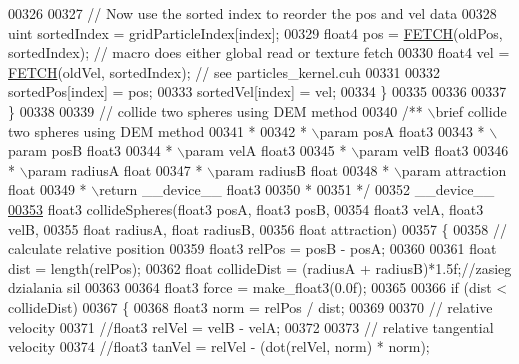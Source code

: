 \begin{DoxyCode}
00326 
00327         \textcolor{comment}{// Now use the sorted index to reorder the pos and vel data}
00328         uint sortedIndex = gridParticleIndex[index];
00329         float4 pos = \hyperlink{particles__kernel_8cuh_a12269d678a65f18889c2a7e98c756457}{FETCH}(oldPos, sortedIndex);       \textcolor{comment}{// macro does either global read or
       texture fetch}
00330         float4 vel = \hyperlink{particles__kernel_8cuh_a12269d678a65f18889c2a7e98c756457}{FETCH}(oldVel, sortedIndex);       \textcolor{comment}{// see particles\_kernel.cuh}
00331 
00332         sortedPos[index] = pos;
00333         sortedVel[index] = vel;
00334     \}
00335 
00336 
00337 \}
00338 
00339 \textcolor{comment}{// collide two spheres using DEM method}
00340 \textcolor{comment}{/** \(\backslash\)brief collide two spheres using DEM method}
00341 \textcolor{comment}{ *}
00342 \textcolor{comment}{ * \(\backslash\)param posA float3}
00343 \textcolor{comment}{ * \(\backslash\)param posB float3}
00344 \textcolor{comment}{ * \(\backslash\)param velA float3}
00345 \textcolor{comment}{ * \(\backslash\)param velB float3}
00346 \textcolor{comment}{ * \(\backslash\)param radiusA float}
00347 \textcolor{comment}{ * \(\backslash\)param radiusB float}
00348 \textcolor{comment}{ * \(\backslash\)param attraction float}
00349 \textcolor{comment}{ * \(\backslash\)return \_\_device\_\_ float3}
00350 \textcolor{comment}{ *}
00351 \textcolor{comment}{ */}
00352 \_\_device\_\_
\hypertarget{particles__kernel__impl_8cuh_source_l00353}{}\hyperlink{particles__kernel__impl_8cuh_a1d93cb067b16b4a472e9c1a08d9d8e68}{00353} float3 collideSpheres(float3 posA, float3 posB,
00354                       float3 velA, float3 velB,
00355                       \textcolor{keywordtype}{float} radiusA, \textcolor{keywordtype}{float} radiusB,
00356                       \textcolor{keywordtype}{float} attraction)
00357 \{
00358     \textcolor{comment}{// calculate relative position}
00359     float3 relPos = posB - posA;
00360 
00361     \textcolor{keywordtype}{float} dist = length(relPos);
00362     \textcolor{keywordtype}{float} collideDist = (radiusA + radiusB)*1.5f;\textcolor{comment}{//zasieg dzialania sil}
00363 
00364     float3 force = make\_float3(0.0f);
00365 
00366     \textcolor{keywordflow}{if} (dist < collideDist)
00367     \{
00368         float3 norm = relPos / dist;
00369 
00370         \textcolor{comment}{// relative velocity}
00371         \textcolor{comment}{//float3 relVel = velB - velA;}
00372 
00373         \textcolor{comment}{// relative tangential velocity}
00374         \textcolor{comment}{//float3 tanVel = relVel - (dot(relVel, norm) * norm);}

\end{DoxyCode}
